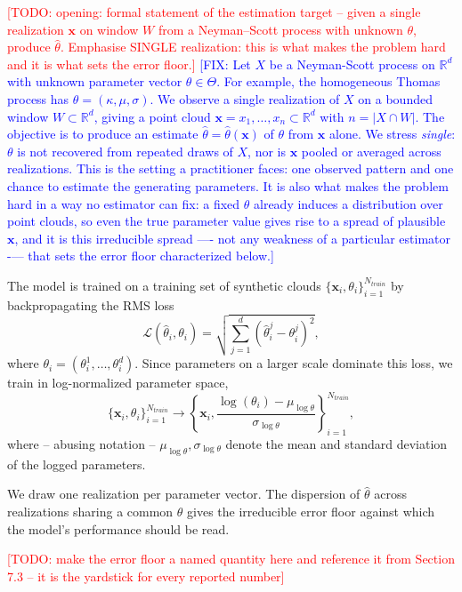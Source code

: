 \documentclass[11pt,letterpaper]{article}
\newcommand{\R}{\mathbb{R}}
\newcommand{\1}{\mathds{1}}
\newcommand{\pc}{\mathbf{x}}
\newcommand{\todo}[1]{\textcolor{red}{[TODO: #1]}}
\newcommand{\fix}[1]{\textcolor{blue}{[FIX: #1]}}
\newcommand{\todo}[1]{}
\newcommand{\fix}[1]{}
\theoremstyle{plain}
\theoremstyle{definitioncolon}
\begin{document}
\todo{opening: formal statement of the estimation target -- given a single
realization $\pc$ on window $W$ from a Neyman--Scott process with unknown
$\theta$, produce $\hat\theta$. Emphasise SINGLE realization: this is what makes
the problem hard and it is what sets the error floor.}
\fix{Let $X$ be a Neyman-Scott process on $\R^d$ with unknown parameter vector
$\theta \in \Theta$. For example, the homogeneous Thomas process has 
$\theta = (\kappa, \mu, \sigma)$. We observe a single realization of $X$ on a 
bounded window $W \subset \R^d$, giving a point cloud
$\pc = {x_1, \dots, x_n} \subset \R^d$ with $n = |X \cap W|$. The objective is to 
produce an estimate $\hat\theta = \hat\theta(\pc)$ of $\theta$ from $\pc$ alone.
We stress \emph{single}: $\theta$ is not recovered from repeated draws of $X$, nor 
is $\pc$ pooled or averaged across realizations. This is the setting a practitioner
faces: one observed pattern and one chance to estimate the generating parameters.
It is also what makes the problem hard in a way no estimator can fix: a 
fixed $\theta$ already induces a distribution over point clouds, so even the true 
parameter value gives rise to a spread of plausible $\pc$, and it is this irreducible 
spread —- not any weakness of a particular estimator -— that sets the error floor 
characterized below.}


The model is trained on a training set of synthetic clouds
$\{\pc_i, \theta_i\}_{i=1}^{N_{train}}$ by backpropagating the RMS loss
    \[
    \mathcal{L}(\hat\theta_i, \theta_i) = \sqrt{\sum_{j=1}^{d}(\hat\theta^j_i - \theta^j_i)^2},
    \]
where $\theta_i = (\theta_i^1, \dots, \theta_i^d)$. Since parameters on a larger scale
dominate this loss, we train in log-normalized parameter space,
    \[
    \{\pc_i, \theta_i\}_{i=1}^{N_{train}} \rightarrow
    \left\{\pc_i, \frac{\log(\theta_i) - \mu_{\log\theta}}
    {\sigma_{\log\theta}}\right\}_{i=1}^{N_{train}},
    \]
where -- abusing notation -- $\mu_{\log\theta}, \sigma_{\log\theta}$ denote the
mean and standard deviation of the logged parameters.

We draw one realization per parameter vector. The dispersion of $\hat\theta$
across realizations sharing a common $\theta$ gives the irreducible error floor
against which the model's performance should be read.

\todo{make the error floor a named quantity here and reference it from
Section 7.3 -- it is the yardstick for every reported number}
\end{document}
